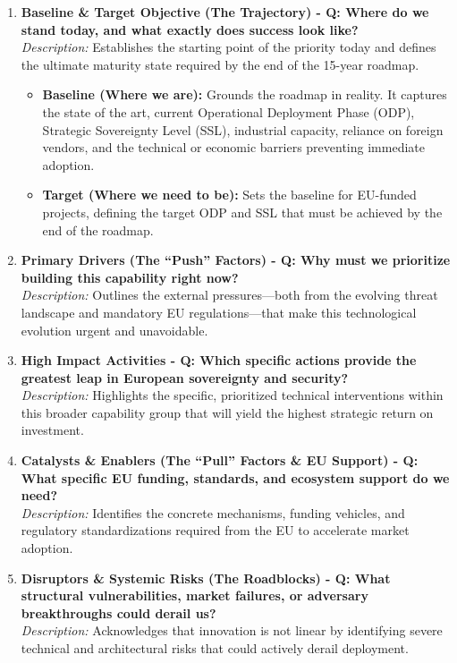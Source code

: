 \documentclass[12pt,a4paper]{report}
\begin{document}
\begin{enumerate}
    \item \textbf{Baseline \& Target Objective (The Trajectory) - Q: Where do we stand today, and what exactly does success look like?}\\
    \textit{Description:} Establishes the starting point of the priority today and defines the ultimate maturity state required by the end of the 15-year roadmap.
    \begin{itemize}
    \item \textbf{Baseline (Where we are):} Grounds the roadmap in reality. It captures the state of the art, current Operational Deployment Phase (ODP), Strategic Sovereignty Level (SSL), industrial capacity, reliance on foreign vendors, and the technical or economic barriers preventing immediate adoption.
    \item \textbf{Target (Where we need to be):} Sets the baseline for EU-funded projects, defining the target ODP and SSL that must be achieved by the end of the roadmap.
\end{itemize}
    
    \item \textbf{Primary Drivers (The ``Push''  Factors) - Q: Why must we prioritize building this capability right now?}\\
    \textit{Description:} Outlines the external pressures---both from the evolving threat landscape and mandatory EU regulations---that make this technological evolution urgent and unavoidable.

    \item \textbf{High Impact Activities - Q: Which specific actions provide the greatest leap in European sovereignty and security?}\\
    \textit{Description:} Highlights the specific, prioritized technical interventions within this broader capability group that will yield the highest strategic return on investment.

    \item \textbf{Catalysts \& Enablers (The ``Pull''  Factors \& EU Support) - Q: What specific EU funding, standards, and ecosystem support do we need?}\\
    \textit{Description:} Identifies the concrete mechanisms, funding vehicles, and regulatory standardizations required from the EU to accelerate market adoption.

    \item \textbf{Disruptors \& Systemic Risks (The Roadblocks) - Q: What structural vulnerabilities, market failures, or adversary breakthroughs could derail us?}\\
    \textit{Description:} Acknowledges that innovation is not linear by identifying severe technical and architectural risks that could actively derail deployment.


\end{enumerate}
\end{document}
